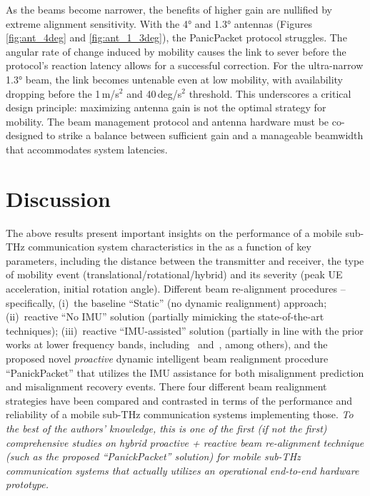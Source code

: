 \documentclass[fleqn,10pt]{wlscirep}
\begin{document}
As the beams become narrower, the benefits of higher gain are nullified by extreme alignment sensitivity. With the 4° and 1.3° antennas (Figures \ref{fig:ant_4deg} and \ref{fig:ant_1_3deg}), the PanicPacket protocol struggles. The angular rate of change induced by mobility causes the link to sever before the protocol's reaction latency allows for a successful correction. For the ultra-narrow 1.3° beam, the link becomes untenable even at low mobility, with availability dropping before the 1\,m/s$^2$ and 40\,deg/s$^2$ threshold. This underscores a critical design principle: maximizing antenna gain is not the optimal strategy for mobility. The beam management protocol and antenna hardware must be co-designed to strike a balance between sufficient gain and a manageable beamwidth that accommodates system latencies.

\section*{Discussion}

The above results present important insights on the performance of a mobile sub-THz communication system characteristics in the as a function of key parameters, including the distance between the transmitter and receiver, the type of mobility event (translational/rotational/hybrid) and its severity (peak UE acceleration, initial rotation angle). Different beam re-alignment procedures -- specifically, (i)~the baseline ``Static'' (no dynamic realignment) approach; (ii)~reactive ``No IMU'' solution (partially mimicking the state-of-the-art techniques); (iii)~reactive ``IMU-assisted'' solution (partially in line with the prior works at lower frequency bands, including~\cite{???} and~\cite{???}, among others), and the proposed novel \emph{proactive} dynamic intelligent beam realignment procedure ``PanickPacket'' that utilizes the IMU assistance for both misalignment prediction and misalignment recovery events. There four different beam realignment strategies have been compared and contrasted in terms of the performance and reliability of a mobile sub-THz communication systems implementing those. \emph{To the best of the authors' knowledge, this is one of the first (if not the first) comprehensive studies on hybrid proactive + reactive beam re-alignment technique (such as the proposed ``PanickPacket'' solution) for mobile sub-THz communication systems that actually utilizes an operational end-to-end hardware prototype.}
\end{document}
